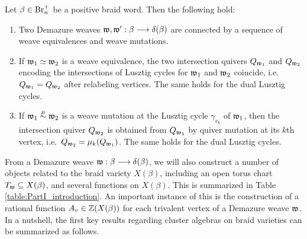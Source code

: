 \begin{fthm}\label{thm:weave_intro1}
Let $\beta\in\mbox{Br}_n^+$ be a positive braid word. Then the following hold:

\begin{enumerate}[label=$(\arabic*)$]
    \item Two Demazure weaves $\mathfrak{w},\mathfrak{w}':\beta\longrightarrow\delta(\beta)$ are connected by a sequence of weave equivalences and weave mutations.\\

    \item If $\mathfrak{w}_1\simeq\mathfrak{w}_2$ is a weave equivalence, the two intersection quivers $Q_{\mathfrak{w}_1}$ and $Q_{\mathfrak{w}_2}$ encoding the intersections of Lusztig cycles for $\mathfrak{w}_1$ and $\mathfrak{w}_2$ coincide, i.e.~$Q_{\mathfrak{w}_1}=Q_{\mathfrak{w}_2}$ after relabeling vertices. The same holds for the dual Lusztig cycles.\\

    \item If $\mathfrak{w}_1\stackrel{\mu}{\sim}\mathfrak{w}_2$ is a weave mutation at the Lusztig cycle $\gamma_{v_k}$ of $\mathfrak{w}_1$, then the intersection quiver $Q_{\mathfrak{w}_2}$ is obtained from $Q_{\mathfrak{w}_1}$ by quiver mutation at its $k$th vertex, i.e.~$Q_{\mathfrak{w}_2}=\mu_k(Q_{\mathfrak{w}_1})$. The same holds for the dual Lusztig cycles.\\
\end{enumerate}
\end{fthm}
\vspace{0.2cm}
\noindent From a Demazure weave $\mathfrak{w}:\beta\longrightarrow\delta(\beta)$, we will also construct a number of objects related to the braid variety $X(\beta)$, including an open torus chart $T_{\mathfrak{w}}\subseteq X(\beta)$, and several functions on $X(\beta)$. This is summarized in Table \ref{table:PartI_introduction}. An important instance of this is the construction of a rational function $A_v\in\mathbb{Z}(X(\beta))$ for each trivalent vertex of a Demazure weave $\mathfrak{w}$. In a nutshell, the first key results regarding cluster algebras on braid varieties can be summarized as follows.

